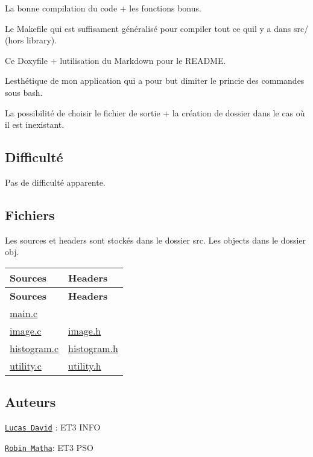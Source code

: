 \begin{DoxyItemize}
\item La bonne compilation du code + les fonctions bonus.
\item Le Makefile qui est suffisament généralisé pour compiler tout ce qu\textquotesingle{}il y a dans src/ (hors library).
\item Ce Doxyfile + l\textquotesingle{}utilisation du Markdown pour le R\+E\+A\+D\+ME.
\item L\textquotesingle{}esthétique de mon application qui a pour but d\textquotesingle{}imiter le princie des commandes sous bash.
\item La possibilité de choisir le fichier de sortie + la création de dossier dans le cas où il est inexistant.
\end{DoxyItemize}

\subsection*{Difficulté }

Pas de difficulté apparente.

\subsection*{Fichiers }

Les sources et headers sont stockés dans le dossier src. Les objects dans le dossier obj.

\tabulinesep=1mm
\begin{longtabu} spread 0pt [c]{*{2}{|X[-1]}|}
\hline
\rowcolor{\tableheadbgcolor}\textbf{ Sources  }&\textbf{ Headers   }\\
\endfirsthead
\hline
\endfoot
\hline
\rowcolor{\tableheadbgcolor}\textbf{ Sources  }&\textbf{ Headers   }\\
\endhead
\mbox{\hyperlink{main_8c}{main.\+c}}  &\\
\mbox{\hyperlink{image_8c}{image.\+c}}  &\mbox{\hyperlink{image_8h}{image.\+h}}   \\
\mbox{\hyperlink{histogram_8c}{histogram.\+c}}  &\mbox{\hyperlink{histogram_8h}{histogram.\+h}}   \\
\mbox{\hyperlink{utility_8c}{utility.\+c}}  &\mbox{\hyperlink{utility_8h}{utility.\+h}}   \\
\end{longtabu}


\subsection*{Auteurs }

\href{mailto:lucas.david@u-psud.fr}{\tt Lucas David} \+: E\+T3 I\+N\+FO

\href{mailto:robin.matha@u-psud.fr}{\tt Robin Matha}\+: E\+T3 P\+SO 